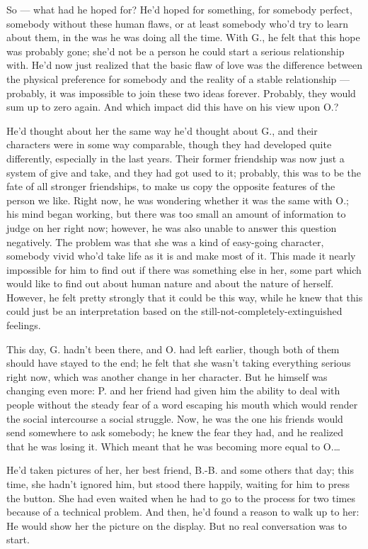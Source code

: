 So --- what had he hoped for? He'd hoped for something, for somebody perfect, somebody without these human flaws, or at least somebody who'd try to learn about them, in the was he was doing all the time. With G., he felt that this hope was probably gone; she'd not be a person he could start a serious relationship with. He'd now just realized that the basic flaw of love was the difference between the physical preference for somebody and the reality of a stable relationship --- probably, it was impossible to join these two ideas forever. Probably, they would sum up to zero again.
And which impact did this have on his view upon O.?

He'd thought about her the same way he'd thought about G., and their characters were in some way comparable, though they had developed quite differently, especially in the last years. Their former friendship was now just a system of give and take, and they had got used to it; probably, this was to be the fate of all stronger friendships, to make us copy the opposite features of the person we like. Right now, he was wondering whether it was the same with O.; his mind began working, but there was too small an amount of information to judge on her right now; however, he was also unable to answer this question negatively. The problem was that she was a kind of easy-going character, somebody vivid who'd take life as it is and make most of it. This made it nearly impossible for him to find out if there was something else in her, some part which would like to find out about human nature and about the nature of herself. However, he felt pretty strongly that it could be this way, while he knew that this could just be an interpretation based on the still-not-completely-extinguished feelings.

This day, G. hadn't been there, and O. had left earlier, though both of them should have stayed to the end; he felt that she wasn't taking everything serious right now, which was another change in her character. But he himself was changing even more: P. and her friend had given him the ability to deal with people without the steady fear of a word escaping his mouth which would render the social intercourse a social struggle. Now, he was the one his friends would send somewhere to ask somebody; he knew the fear they had, and he realized that he was losing it. Which meant that he was becoming more equal to O.\ldots

He'd taken pictures of her, her best friend, B.-B. and some others that day; this time, she hadn't ignored him, but stood there happily, waiting for him to press the button. She had even waited when he had to go to the process for two times because of a technical problem. And then, he'd found a reason to walk up to her: He would show her the picture on the display. But no real conversation was to start.

